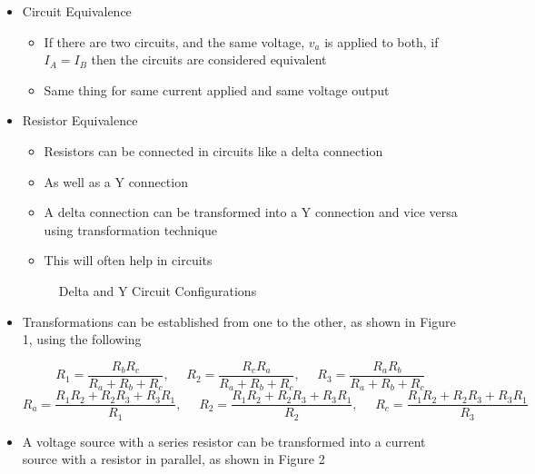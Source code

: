 \begin{itemize}

  \item Circuit Equivalence

    \begin{itemize}

      \item If there are two circuits, and the same voltage, $v_a$ is applied to both, if $I_A=I_B$ then the circuits are considered equivalent

      \item Same thing for same current applied and same voltage output

    \end{itemize}

  \item Resistor Equivalence

    \begin{itemize}

      \item Resistors can be connected in circuits like a delta connection

      \item As well as a Y connection

      \item A delta connection can be transformed into a Y connection and vice versa using transformation technique

      \item This will often help in circuits

    \end{itemize}

    \begin{figure}[H]
      \centering
      
      \caption{Delta and Y Circuit Configurations}
      \label{fig:1}
    \end{figure}

  \item Transformations can be established from one to the other, as shown in Figure 1, using the following

    $$\boxed{R_1=\frac{R_bR_c}{R_a+R_b+R_c},\,\,\,\,\,\,\,\,R_2=\frac{R_cR_a}{R_a+R_b+R_c},\,\,\,\,\,\,\,\,R_3=\frac{R_aR_b}{R_a+R_b+R_c}}$$
    $$\boxed{R_a=\frac{R_1R_2+R_2R_3+R_3R_1}{R_1},\,\,\,\,\,\,\,\,R_2=\frac{R_1R_2+R_2R_3+R_3R_1}{R_2},\,\,\,\,\,\,\,\,R_c=\frac{R_1R_2+R_2R_3+R_3R_1}{R_3}}$$

  \item A voltage source with a series resistor can be transformed into a current source with a resistor in parallel, as shown in Figure 2


\end{itemize}
